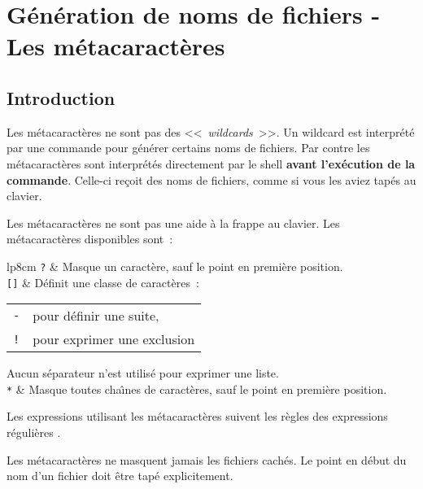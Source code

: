 \section{\label{basic-metacars}G{\'e}n{\'e}ration de noms de fichiers - Les m{\'e}tacaract{\`e}res}

\subsection{Introduction}

Les m{\'e}tacaract{\`e}res ne sont pas des
<<~\textsl{wildcards}~>>. Un wildcard est
interpr{\'e}t{\'e} par une commande pour g{\'e}n{\'e}rer certains noms
de fichiers. Par contre les m{\'e}tacaract{\`e}res sont
interpr{\'e}t{\'e}s directement par le shell \textbf{avant
l'ex{\'e}cution de la commande}. Celle-ci re\c{c}oit des noms de
fichiers, comme si vous les aviez tap{\'e}s au clavier.

Les m{\'e}tacaract{\`e}res ne sont pas une aide {\`a} la frappe au clavier.
Les m{\'e}tacaract{\`e}res disponibles sont~:~\\
\begin{tabular}{lp{8cm}}
	\texttt{?}		&
	Masque un caract{\`e}re, sauf le point en premi{\`e}re position.\\[0.5cm]
	\texttt{[]}		&
	D{\'e}finit une classe de caract{\`e}res~:
	\begin{tabular}{lp{5cm}}
		\index{-@\texttt{-}}\texttt{-}	& pour d{\'e}finir une suite,\\
		\index{!@\texttt{!}}\texttt{!}	& pour exprimer une exclusion
	\end{tabular}
	Aucun s{\'e}parateur n'est utilis{\'e} pour exprimer une liste.\\[0.5cm]
	\texttt{*}		&
	Masque toutes cha{\^\i}nes de caract{\`e}res, sauf le point en premi{\`e}re position.
\end{tabular}

\begin{remarque}
Les expressions utilisant les m{\'e}tacaract{\`e}res suivent les r{\`e}gles des expressions r{\'e}guli{\`e}res
{\Unix}.
\end{remarque}

Les m{\'e}tacaract{\`e}res ne masquent jamais les fichiers cach{\'e}s. Le point en d{\'e}but du nom d'un
fichier doit {\^e}tre tap{\'e} explicitement.

